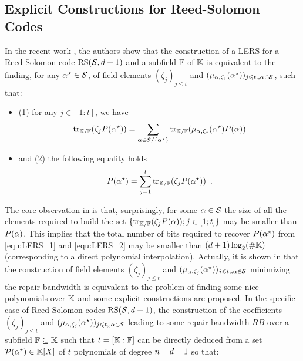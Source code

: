\documentclass{llncs}
\begin{document}
\subsection{Explicit Constructions for Reed-Solomon Codes}
In the recent work \cite{GW16}, the authors show that the construction of a LERS for a Reed-Solomon code $\RS[\pubSet, \order + 1]$ and a subfield $\FField$ of $\Field$
is equivalent to the finding, for any $\pubEltStar\in \pubSet$, of field elements $(\zeta_j)_{j\leqslant t}$ and $(\mu_{\pubEltNoIndex,\zeta_j}(\pubEltStar))_{j\leqslant t,,\pubEltNoIndex \in \pubSet}$, such that:
\begin{itemize}
\item (1) for any $j\in [1:t]$, we have 
\begin{equation}\label{equ:LERS_1}
\myTrace(\zeta_j P(\pubEltStar)) = \sum_{\pubEltNoIndex \in \pubSet \slash \{\pubEltStar\}} \myTrace(\mu_{\pubEltNoIndex,\zeta_j}(\pubEltStar)P(\pubEltNoIndex))
\end{equation}
\item and (2) the following equality holds
\begin{equation}\label{equ:LERS_2}
P(\pubEltStar) = \sum_{j=1}^t \myTrace(\zeta_j P(\pubEltStar)) \enspace .
\end{equation}
\end{itemize}
The core observation in \cite{GW16} is that, surprisingly, for some $\pubEltNoIndex\in \pubSet$ the size of all the elements required to build the set $\{\myTrace(\zeta_j P(\pubEltNoIndex));j\in [1;t]\}$ may be smaller than $P(\pubEltNoIndex)$. This implies that the total number of bits required to recover $P(\pubEltStar)$ from \eqref{equ:LERS_1} and \eqref{equ:LERS_2} may be smaller than $(\order +1)\log_2(\# \Field)$ (corresponding to a direct polynomial interpolation). Actually, it is shown in \cite{GW16} that the construction of field elements $(\zeta_j)_{j\leqslant t}$ and $(\mu_{\pubEltNoIndex,\zeta_j}(\pubEltStar))_{j\leqslant t,,\pubEltNoIndex \in \pubSet}$ minimizing the repair bandwidth is equivalent to the problem of finding some nice polynomials over $\Field$ \cite[Theorem 4]{GW16} and some explicit constructions are proposed. In the specific case of Reed-Solomon codes $\RS[\pubSet, \order + 1]$, the construction of the coefficients $(\zeta_j)_{j\leqslant t}$ and $(\mu_{\pubEltNoIndex,\zeta_j}(\pubEltStar))_{j\leqslant t,,\pubEltNoIndex \in \pubSet}$ leading to some repair bandwidth $RB$ over a subfield $\FField\subseteq \Field$ such that $t=[\Field:\FField]$ can be directly deduced from a set $\polySet\in \Field[X]$ of $t$ polynomials of degree $\nbShares - \order - 1$ so that:
\end{document}
